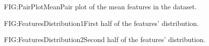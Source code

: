 \begin{figure}[Pair Plot of the Mean Features]{FIG:PairPlotMean}{Pair plot of the mean features in the dataset.}
    \begin{adjustbox}{width=1\textwidth,height=\textheight,keepaspectratio}

    \end{adjustbox}
\end{figure}



\begin{figure}[First half of the features' distribution]{FIG:FeaturesDistribution1}{First half of the features' distribution.}
    \begin{adjustbox}{width=1\textwidth,height=\textheight,keepaspectratio}
    \end{adjustbox}
\end{figure}


\begin{figure}[Second half of the features' distribution]{FIG:FeaturesDistribution2}{Second half of the features' distribution.}
    \begin{adjustbox}{width=1\textwidth,height=\textheight,keepaspectratio}
    \end{adjustbox}
\end{figure}

